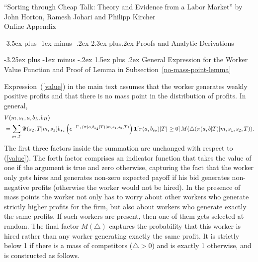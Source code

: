 \documentclass[12pt]{article}
\makeatletter
\renewcommand{\thesection}{\Roman{section}}
\renewcommand{\thesubsection}{\Roman{section}.\Alph{subsection}}
\renewcommand{\section}{%
  \@startsection{section}{1}{\z@}%
  {-3.5ex plus -1ex minus -.2ex}%
  {2.3ex plus.2ex}%
  {\normalfont\Large\bfseries}%
}
\renewcommand{\subsection}{%
  \@startsection{subsection}{2}{\z@}%
  {-3.25ex plus -1ex minus -.2ex}%
  {1.5ex plus .2ex}%
  {\normalfont\large\bfseries}%
}
\makeatother
\begin{document}
\newpage
\appendix
\renewcommand{\thesection}{\Alph{section}}
\renewcommand{\thesubsection}{\Alph{section}.\arabic{subsection}}
\setcounter{section}{0} %
\setcounter{page}{1}

\begin{centering}
    \Large{``Sorting through Cheap Talk: Theory and Evidence from a Labor Market'' by John Horton, Ramesh Johari and Philipp Kircher \\ \bigskip 
    \LARGE Online Appendix
    \\ \bigskip}
\end{centering}




\section{Proofs and Analytic Derivations} \label{online_app:analysis}


\subsection{General Expression for the Worker Value Function and Proof of Lemma in Subsection~\ref{no-mass-point-lemma}}\label{online_app:value_and_lemma}

Expression~(\ref{value}) in the main text assumes that the worker generates
weakly positive profits and that there is no mass point in the distribution
of profits. In general,
\begin{align}
&V(m,s_{1},a,b_{L},b_{H}) \label{value1} \\   &=\sum_{s_{2},T}\Psi (s_{2},T|m,s_{1})b_{s_{2}}\left( e^{-\Gamma
_{+}(\pi (a,b_{s_2}|T)|m,s_{1},s_{2},T)} \right) \mathbf{1}[\pi (a,b_{s_2})|T)\geq 0] \, M(\bigtriangleup (\pi
(a,b|T)|m,s_{1},s_{2},T)). \notag 
\end{align}
The first three factors inside the summation are unchanged with respect to (\ref{value}). The forth factor comprises an indicator function that takes the value of one if the argument is true and zero otherwise, capturing the fact that the worker only gets hires and generates non-zero expected payoff if his bid generates non-negative profits (otherwise the worker would not be hired). In the presence of mass points the worker not only has to worry about other workers who generate strictly higher profits for the firm, but also about workers who generate exactly the same profits. If such workers are present, then one of them gets selected at random. The final factor $M(\bigtriangleup )$ captures the probability that this worker is hired rather than any worker generating exactly the same profit. It is
strictly below 1 if there is a mass of competitors ($\bigtriangleup >0$) and is exactly 1 otherwise, and is constructed as follows.
\end{document}
